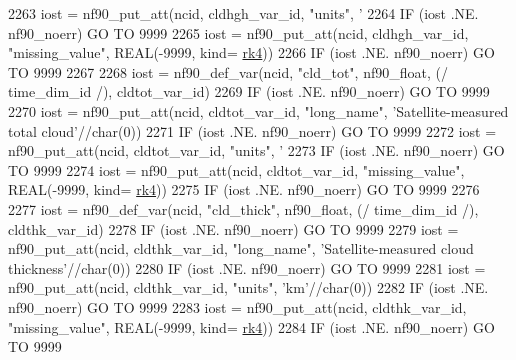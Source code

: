 \begin{DoxyCode}
{{{{2263     iost    = nf90\_put\_att(ncid, cldhgh\_var\_id, \textcolor{stringliteral}{"units"}, \textcolor{stringliteral}{'%
2264     \textcolor{keywordflow}{IF} (iost .NE. nf90\_noerr) \textcolor{keywordflow}{GO TO} 9999
2265     iost    = nf90\_put\_att(ncid, cldhgh\_var\_id, \textcolor{stringliteral}{"missing\_value"}, \textcolor{keywordtype}{REAL}(-9999, kind=
      \hyperlink{namespaceportable_abaed22a509442771d3fba69bebda0b33}{rk4}))
2266     \textcolor{keywordflow}{IF} (iost .NE. nf90\_noerr) \textcolor{keywordflow}{GO TO} 9999
2267 
2268     iost    = nf90\_def\_var(ncid, \textcolor{stringliteral}{"cld\_tot"}, nf90\_float, (/ time\_dim\_id /), cldtot\_var\_id)
2269     \textcolor{keywordflow}{IF} (iost .NE. nf90\_noerr) \textcolor{keywordflow}{GO TO} 9999
2270     iost    = nf90\_put\_att(ncid, cldtot\_var\_id, \textcolor{stringliteral}{"long\_name"}, \textcolor{stringliteral}{'Satellite-measured total cloud'}//char(0))
2271     \textcolor{keywordflow}{IF} (iost .NE. nf90\_noerr) \textcolor{keywordflow}{GO TO} 9999
2272     iost    = nf90\_put\_att(ncid, cldtot\_var\_id, \textcolor{stringliteral}{"units"}, \textcolor{stringliteral}{'%
2273     \textcolor{keywordflow}{IF} (iost .NE. nf90\_noerr) \textcolor{keywordflow}{GO TO} 9999
2274     iost    = nf90\_put\_att(ncid, cldtot\_var\_id, \textcolor{stringliteral}{"missing\_value"}, \textcolor{keywordtype}{REAL}(-9999, kind=
      \hyperlink{namespaceportable_abaed22a509442771d3fba69bebda0b33}{rk4}))
2275     \textcolor{keywordflow}{IF} (iost .NE. nf90\_noerr) \textcolor{keywordflow}{GO TO} 9999
2276 
2277     iost    = nf90\_def\_var(ncid, \textcolor{stringliteral}{"cld\_thick"}, nf90\_float, (/ time\_dim\_id /), cldthk\_var\_id)
2278     \textcolor{keywordflow}{IF} (iost .NE. nf90\_noerr) \textcolor{keywordflow}{GO TO} 9999
2279     iost    = nf90\_put\_att(ncid, cldthk\_var\_id, \textcolor{stringliteral}{"long\_name"}, \textcolor{stringliteral}{'Satellite-measured cloud thickness'}//char(0))
2280     \textcolor{keywordflow}{IF} (iost .NE. nf90\_noerr) \textcolor{keywordflow}{GO TO} 9999
2281     iost    = nf90\_put\_att(ncid, cldthk\_var\_id, \textcolor{stringliteral}{"units"}, \textcolor{stringliteral}{'km'}//char(0))
2282     \textcolor{keywordflow}{IF} (iost .NE. nf90\_noerr) \textcolor{keywordflow}{GO TO} 9999
2283     iost    = nf90\_put\_att(ncid, cldthk\_var\_id, \textcolor{stringliteral}{"missing\_value"}, \textcolor{keywordtype}{REAL}(-9999, kind=
      \hyperlink{namespaceportable_abaed22a509442771d3fba69bebda0b33}{rk4}))
2284     \textcolor{keywordflow}{IF} (iost .NE. nf90\_noerr) \textcolor{keywordflow}{GO TO} 9999
}}}}}}
\end{DoxyCode}
